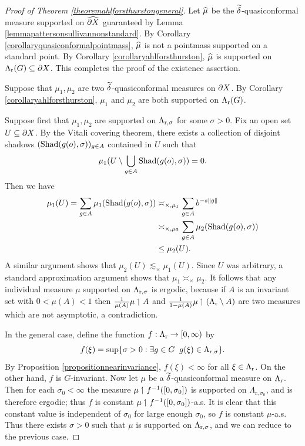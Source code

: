 \begin{proof}[Proof of Theorem \ref{theoremahlforsthurstongeneral}]
Let $\widehat\mu$ be the $\widetilde\delta$-quasiconformal measure supported on $\widehat{\partial X}$ guaranteed by Lemma \ref{lemmapattersonsullivannonstandard}. By Corollary \ref{corollaryquasiconformalpointmass}, $\widehat\mu$ is not a pointmass supported on a standard point. By Corollary \ref{corollaryahlforsthurston}, $\widehat\mu$ is supported on $\Lambda_{\mathrm r}(G) \subseteq \partial X$. This completes the proof of the existence assertion.

Suppose that $\mu_1,\mu_2$ are two $\widetilde\delta$-quasiconformal measures on $\partial X$. By Corollary \ref{corollaryahlforsthurston}, $\mu_1$ and $\mu_2$ are both supported on $\Lambda_{\mathrm r}(G)$.

Suppose first that $\mu_1,\mu_2$ are supported on $\Lambda_{\mathrm r,\sigma}$ for some $\sigma > 0$. Fix an open set $U\subseteq\partial X$. By the Vitali covering theorem, there exists a collection of disjoint shadows $(\operatorname{Shad}(g(o),\sigma))_{g\in A}$ contained in $U$ such that 
\[
\mu_1(U\setminus \bigcup_{g\in A}\operatorname{Shad}(g(o),\sigma)) = 0.
\]
Then we have 
\begin{align*}
\mu_1(U) = \sum_{g\in A} \mu_1(\operatorname{Shad}(g(o),\sigma)) 
&\asymp_{\times,\mu_1} \sum_{g\in A} b^{-s\|g\|}\\
&\asymp_{\times,\mu_2} \sum_{g\in A} \mu_2(\operatorname{Shad}(g(o),\sigma))\\
&\leq \mu_2(U).
\end{align*}
A similar argument shows that $\mu_2(U) \lesssim_\times \mu_1(U)$. Since $U$ was arbitrary, a standard approximation argument shows that $\mu_1\asymp_\times \mu_2$. It follows that any individual measure $\mu$ supported on $\Lambda_{\mathrm r,\sigma}$ is ergodic, because if $A$ is an invariant set with $0 < \mu(A) < 1$ then $\frac{1}{\mu(A)}\mu\upharpoonleft A$ and $\frac{1}{1 - \mu(A)}\mu\upharpoonleft (\Lambda_{\mathrm r}\setminus A)$ are two measures which are not asymptotic, a contradiction.

In the general case, define the function $f:\Lambda_{\mathrm r}\to {[0,\infty)}$ by
\[
f(\xi) = \sup\{\sigma > 0 : \exists g\in G \;\; g(\xi)\in\Lambda_{\mathrm r,\sigma}\}.
\]
By Proposition \ref{propositionnearinvariance}, $f(\xi) < \infty$ for all $\xi\in\Lambda_{\mathrm r}$. On the other hand, $f$ is $G$-invariant. Now let $\mu$ be a $\widetilde\delta$-quasiconformal measure on $\Lambda_{\mathrm r}$. Then for each $\sigma_0 < \infty$ the measure $\mu\upharpoonleft f^{-1}([0,\sigma_0])$ is supported on $\Lambda_{\mathrm r, \sigma_0}$, and is therefore ergodic; thus $f$ is constant $\mu\upharpoonleft f^{-1}([0,\sigma_0])$-a.s. It is clear that this constant value is independent of $\sigma_0$ for large enough $\sigma_0$, so $f$ is constant $\mu$-a.s. Thus there exists $\sigma > 0$ such that $\mu$ is supported on $\Lambda_{\mathrm r,\sigma}$, and we can reduce to the previous case.
\end{proof}


